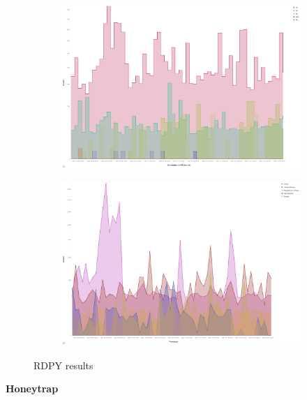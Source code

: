 \begin{figure}
    \centering

    \begin{subfigure}[b]{0.49\textwidth}
        \centering
        \includegraphics[width=\textwidth]{figures/tpot-cowire-attacks.png}
        \caption{}
        \label{fig:tpot-rdpy-attacks}
    \end{subfigure}
    \hfill
    \begin{subfigure}[b]{0.49\textwidth}
        \centering
        \includegraphics[width=\textwidth]{figures/tpot-cowire-country.png}
        \caption{}
        \label{fig:tpot-rdpy-country}
    \end{subfigure}
    \caption[RDPY results]{RDPY results}
    \label{fig:rdpy-results}
\end{figure}

\textbf{Honeytrap}


